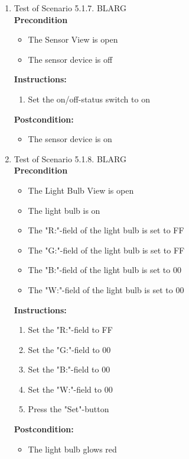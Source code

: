 \documentclass[a4paper]{article}
\newlength{\testlabellength}
\newenvironment{testlist}{\begin{enumerate}[label=\bfseries Instruction \thesubsection.\arabic* , labelindent=0pt, labelwidth=\testlabellength , leftmargin=2cm]}{\end{enumerate}}
\newenvironment{precondition}{
{\color{white}BLARG}\\ 
\textbf{Precondition}
\begin{itemize}[labelindent=0cm, labelwidth=2cm , leftmargin=1cm]
}
{\end{itemize}}
\newenvironment{instruction}{
\textbf{Instructions:}
\begin{enumerate}[label=\bfseries  \arabic*., labelindent=0cm, labelwidth=2cm , leftmargin=1cm]
}
{\end{enumerate}}
\newenvironment{postcondition}{
\textbf{Postcondition:}
\begin{itemize}[labelindent=0cm, labelwidth=2cm , leftmargin=1cm]
}
{\end{itemize}}
\begin{document}
\begin{appendices}
\begin{testlist}
	\item Test of Scenario 5.1.7.
		\begin{precondition}
			\item The Sensor View is open
			\item The sensor device is off
		\end{precondition}
		\begin{instruction}
			\item Set the on/off-status switch to on
		\end{instruction}
		\begin{postcondition}
			\item The sensor device is on
		\end{postcondition}
\newpage
	\item  Test of Scenario 5.1.8.
		\begin{precondition}
			\item The Light Bulb View is open
			\item The light bulb is on
			\item The "R:"-field of the light bulb is set to FF
			\item The "G:"-field of the light bulb is set to FF
			\item The "B:"-field of the light bulb is set to 00
			\item The "W:"-field of the light bulb is set to 00
		\end{precondition}
		\begin{instruction}
			\item Set the "R:"-field to FF
			\item Set the "G:"-field to 00
			\item Set the "B:"-field to 00
			\item Set the "W:"-field to 00
			\item Press the "Set"-button
		\end{instruction}
		\begin{postcondition}
			\item The light bulb glows red
		\end{postcondition}


\end{testlist}
\end{appendices}
\end{document}
